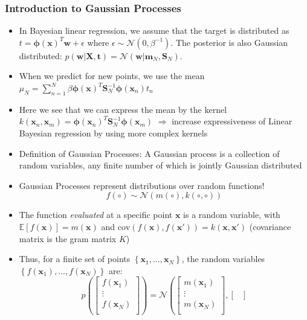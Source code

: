 \subsubsection{Introduction to Gaussian Processes}
\begin{itemize}
	\item In Bayesian linear regression, we assume that the target is distributed as $t=\bm{\phi}\left(\bm{x}\right)^T \bm{w} + \epsilon$ where $\epsilon\sim\mathcal{N}(0,\beta^{-1})$. The posterior is also Gaussian distributed: $p(\bm{w}|\bm{X},\bm{t}) = \mathcal{N}(\bm{w}|\bm{m}_N, \bm{S}_N)$.
	\item When we predict for new points, we use the mean $\mu_N = \sum_{n=1}^{N}\beta \bm{\phi}(\bm{x})^T \bm{S}_N^{-1} \bm{\phi}(\bm{x}_n)t_n$ %
	\item Here we see that we can express the mean by the kernel $k(\bm{x}_n, \bm{x}_m) = \bm{\phi}(\bm{x}_n)^T \bm{S}_N^{-1} \bm{\phi}(\bm{x}_m)$ $\Rightarrow$ increase expressiveness of Linear Bayesian regression by using more complex kernels
	\item Definition of Gaussian Processes: A Gaussian process is a collection of random variables, any finite number of which is jointly Gaussian distributed
	\item Gaussian Processes represent distributions over random functions!
	$$f(\circ) \sim \mathcal{N}(m(\circ), k(\circ, \circ))$$
	\item The function \textit{evaluated} at a specific point $\bm{x}$ is a random variable, with $\mathbb{E}[f(\bm{x})] = m(\bm{x})$ and $\text{cov}(f(\bm{x}), f(\bm{x}')) = k(\bm{x}, \bm{x}')$ (covariance matrix is the gram matrix $K$)
	\item Thus, for a finite set of points $\left\{\bm{x}_1, ...,\bm{x}_N\right\}$, the random variables $\left\{f(\bm{x}_1), ...,f(\bm{x}_N)\right\}$ are:
	$$p\left(\begin{bmatrix}
	f(\bm{x}_1)\\
	\vdots\\
	f(\bm{x}_N)\\
	\end{bmatrix}\right) = \mathcal{N}\left(\begin{bmatrix}
	m(\bm{x}_1)\\
	\vdots\\
	m(\bm{x}_N)\\
	\end{bmatrix}, \begin{bmatrix}

\end{bmatrix}$$
\end{itemize}
